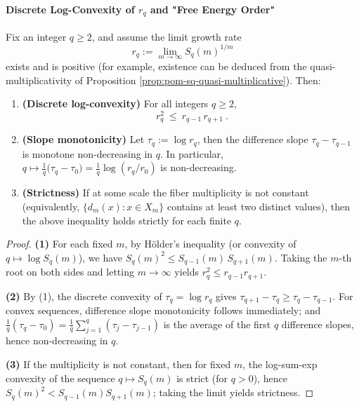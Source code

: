 \paragraph{Discrete Log-Convexity of \texorpdfstring{$r_q$}{rq} and "Free Energy Order"}
\begin{proposition}\label{prop:pom-rq-logconvex-free-energy-order}
Fix an integer \(q\ge 2\), and assume the limit growth rate
\[
r_q:=\lim_{m\to\infty}S_q(m)^{1/m}
\]
exists and is positive (for example, existence can be deduced from the quasi-multiplicativity of Proposition \ref{prop:pom-sq-quasi-multiplicative}).
Then:
\begin{enumerate}
  \item \textbf{(Discrete log-convexity)} For all integers \(q\ge 2\),
  \[
  \boxed{\ r_q^{2}\ \le\ r_{q-1}\,r_{q+1}\ }.
  \]
  \item \textbf{(Slope monotonicity)} Let \(\tau_q:=\log r_q\), then the difference slope \(\tau_q-\tau_{q-1}\) is monotone non-decreasing in \(q\).
  In particular, \(q\mapsto \frac{1}{q}\bigl(\tau_q-\tau_0\bigr)=\frac{1}{q}\log(r_q/r_0)\) is non-decreasing.
  \item \textbf{(Strictness)} If at some scale the fiber multiplicity is not constant (equivalently, \(\{d_m(x):x\in X_m\}\) contains at least two distinct values), then the above inequality holds strictly for each finite \(q\).
\end{enumerate}
\end{proposition}
\begin{proof}
\textbf{(1)} For each fixed \(m\), by H\"older's inequality (or convexity of \(q\mapsto \log S_q(m)\)), we have
\(
S_q(m)^2\le S_{q-1}(m)\,S_{q+1}(m)
\).
Taking the \(m\)-th root on both sides and letting \(m\to\infty\) yields \(r_q^2\le r_{q-1}r_{q+1}\).
\par
\textbf{(2)} By (1), the discrete convexity of \(\tau_q=\log r_q\) gives
\(
\tau_{q+1}-\tau_q\ge \tau_q-\tau_{q-1}
\).
For convex sequences, difference slope monotonicity follows immediately; and
\(
\frac{1}{q}(\tau_q-\tau_0)=\frac{1}{q}\sum_{j=1}^{q}(\tau_j-\tau_{j-1})
\)
is the average of the first \(q\) difference slopes, hence non-decreasing in \(q\).
\par
\textbf{(3)} If the multiplicity is not constant, then for fixed \(m\), the log-sum-exp convexity of the sequence \(q\mapsto S_q(m)\) is strict (for \(q>0\)), hence \(S_q(m)^2< S_{q-1}(m)S_{q+1}(m)\);
taking the limit yields strictness.
\end{proof}
